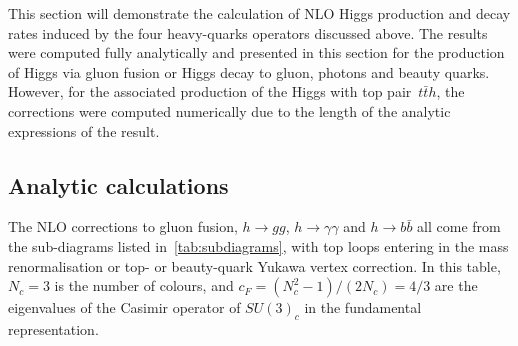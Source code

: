 This section will demonstrate the calculation of NLO Higgs production and decay rates induced by the four heavy-quarks operators discussed above. The results were computed fully analytically and presented in this section for the production of Higgs via gluon fusion or Higgs decay to gluon, photons and beauty quarks. However, for the associated production of the Higgs with top pair~$ t\bar{t} h$, the corrections were computed numerically due to the length of the analytic expressions of the result.

\subsection{Analytic calculations}
\par The NLO corrections to gluon fusion, $h \to gg$, $h\to \gamma \gamma$ and $ h \to b \bar{b}$ all come from the sub-diagrams listed in~\autoref{tab:subdiagrams}, with top loops entering in the mass renormalisation or top- or beauty-quark Yukawa vertex correction. In this table,  $N_c=3$ is the number of colours, and $c_F=(N_c^2-1)/(2N_c)=4/3$ are the eigenvalues of the Casimir operator of $SU(3)_c$ in the fundamental representation. 
